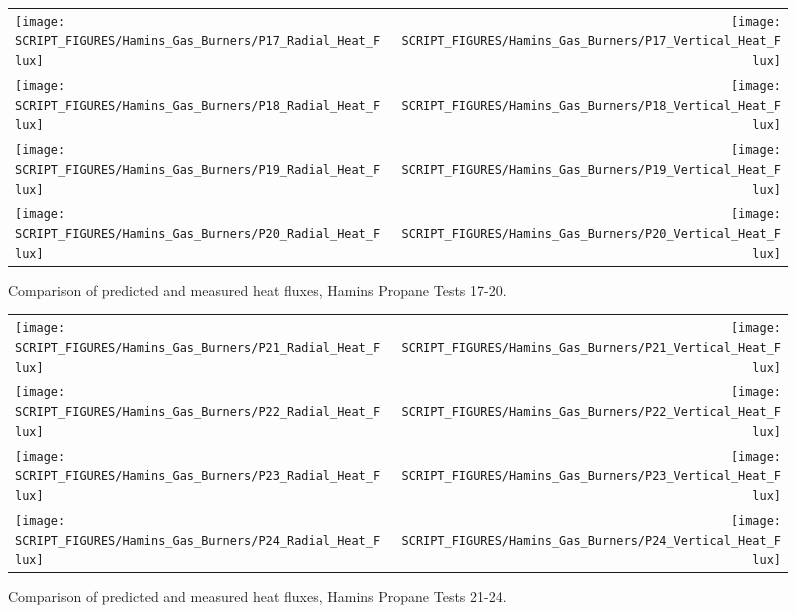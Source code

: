 \begin{figure}[p]
\begin{tabular*}{\textwidth}{l@{\extracolsep{\fill}}r}
\texttt{[image: SCRIPT\_FIGURES/Hamins\_Gas\_Burners/P17\_Radial\_Heat\_Flux]} &
\texttt{[image: SCRIPT\_FIGURES/Hamins\_Gas\_Burners/P17\_Vertical\_Heat\_Flux]} \\
\texttt{[image: SCRIPT\_FIGURES/Hamins\_Gas\_Burners/P18\_Radial\_Heat\_Flux]} &
\texttt{[image: SCRIPT\_FIGURES/Hamins\_Gas\_Burners/P18\_Vertical\_Heat\_Flux]} \\
\texttt{[image: SCRIPT\_FIGURES/Hamins\_Gas\_Burners/P19\_Radial\_Heat\_Flux]} &
\texttt{[image: SCRIPT\_FIGURES/Hamins\_Gas\_Burners/P19\_Vertical\_Heat\_Flux]} \\
\texttt{[image: SCRIPT\_FIGURES/Hamins\_Gas\_Burners/P20\_Radial\_Heat\_Flux]} &
\texttt{[image: SCRIPT\_FIGURES/Hamins\_Gas\_Burners/P20\_Vertical\_Heat\_Flux]}
\end{tabular*}
\label{Hamins_Propane_17-20}
\caption[Heat flux predictions, Hamins propane burner Tests 17-20]
{Comparison of predicted and measured heat fluxes, Hamins Propane Tests 17-20.}
\end{figure}

\begin{figure}[p]
\begin{tabular*}{\textwidth}{l@{\extracolsep{\fill}}r}
\texttt{[image: SCRIPT\_FIGURES/Hamins\_Gas\_Burners/P21\_Radial\_Heat\_Flux]} &
\texttt{[image: SCRIPT\_FIGURES/Hamins\_Gas\_Burners/P21\_Vertical\_Heat\_Flux]} \\
\texttt{[image: SCRIPT\_FIGURES/Hamins\_Gas\_Burners/P22\_Radial\_Heat\_Flux]} &
\texttt{[image: SCRIPT\_FIGURES/Hamins\_Gas\_Burners/P22\_Vertical\_Heat\_Flux]} \\
\texttt{[image: SCRIPT\_FIGURES/Hamins\_Gas\_Burners/P23\_Radial\_Heat\_Flux]} &
\texttt{[image: SCRIPT\_FIGURES/Hamins\_Gas\_Burners/P23\_Vertical\_Heat\_Flux]} \\
\texttt{[image: SCRIPT\_FIGURES/Hamins\_Gas\_Burners/P24\_Radial\_Heat\_Flux]} &
\texttt{[image: SCRIPT\_FIGURES/Hamins\_Gas\_Burners/P24\_Vertical\_Heat\_Flux]}
\end{tabular*}
\label{Hamins_Propane_21-24}
\caption[Heat flux predictions, Hamins propane burner Tests 21-24]
{Comparison of predicted and measured heat fluxes, Hamins Propane Tests 21-24.}
\end{figure}

